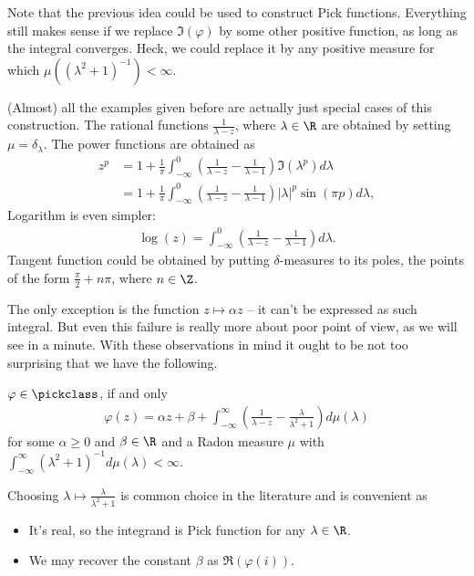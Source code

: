 Note that the previous idea could be used to construct Pick functions. Everything still makes sense if we replace $\Im(\varphi)$ by some other positive function, as long as the integral converges. Heck, we could replace it by any positive measure for which $\mu((\lambda^2 + 1)^{-1}) < \infty$.

(Almost) all the examples given before are actually just special cases of this construction. The rational functions $\frac{1}{\lambda - z}$, where $\lambda \in \R$ are obtained by setting $\mu = \delta_{\lambda}$. The power functions are obtained as
\begin{align*}
	z^{p} &= 1 + \frac{1}{\pi}\int_{-\infty}^{0} \left(\frac{1}{\lambda - z} - \frac{1}{\lambda - 1}\right) \Im(\lambda^{p}) d \lambda \\
	&=1 + \frac{1}{\pi}\int_{-\infty}^{0} \left(\frac{1}{\lambda - z} - \frac{1}{\lambda - 1}\right) |\lambda|^{p} \sin(\pi p) d \lambda,
\end{align*}
Logarithm is even simpler:
\begin{align*}
	\log(z) = \int_{-\infty}^{0} \left(\frac{1}{\lambda - z} - \frac{1}{\lambda - 1}\right) d \lambda.
\end{align*}
Tangent function could be obtained by putting $\delta$-measures to its poles, the points of the form $\frac{\pi}{2} + n \pi$, where $n \in \Z$.

The only exception is the function $z \mapsto \alpha z$ -- it can't be expressed as such integral. But even this failure is really more about poor point of view, as we will see in a minute. With these observations in mind it ought to be not too surprising that we have the following.

\begin{lause}\label{pick_nevanlinna_herglotz_representation_theorem}
	$\varphi \in \pickclass$, if and only
	\begin{align}\label{pick_representation}
		\varphi(z) = \alpha z + \beta + \int_{-\infty}^{\infty} \left(\frac{1}{\lambda - z} - \frac{\lambda}{\lambda^2 + 1}\right) d \mu(\lambda)
	\end{align}
	for some $\alpha \geq 0$ and $\beta \in \R$ and a Radon measure $\mu$ with $\int_{-\infty}^{\infty} (\lambda^2 + 1)^{-1} d \mu(\lambda) < \infty$.
\end{lause}

Choosing $\lambda \mapsto \frac{\lambda}{\lambda^2 + 1}$ is common choice in the literature and is convenient as
\begin{itemize}
	\item It's real, so the integrand is Pick function for any $\lambda \in \R$.
	\item We may recover the constant $\beta$ as $\Re(\varphi(i))$.
\end{itemize}

